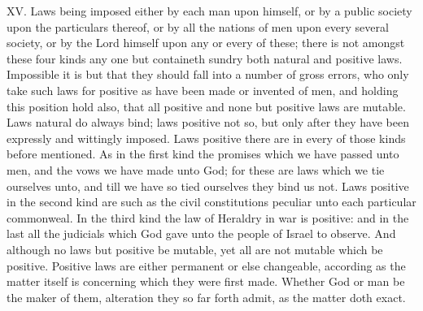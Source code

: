 XV. Laws being imposed either by each man upon himself, or by a public society upon the particulars thereof, or by all the nations of men upon every several society, or by the Lord himself upon any or every of these; there is not amongst these four kinds any one but containeth sundry both natural and positive laws. Impossible it is but that they should fall into a number of gross errors, who only take such laws for positive as have been made or invented of men, and holding this position hold also, that all positive and none but positive laws are mutable. Laws natural do always bind; laws positive not so, but only after they have been expressly and  wittingly imposed. Laws positive there are in every of those kinds before mentioned. As in the first kind the promises which we have passed unto men, and the vows we have made unto God; for these are laws which we tie ourselves unto, and till we have so tied ourselves they bind us not. Laws positive in the second kind are such as the civil constitutions peculiar unto each particular commonweal. In the third kind the law of Heraldry in war is positive: and in the last all the judicials which God gave unto the people of Israel to observe. And although no laws but positive be mutable, yet all are not mutable which be positive. Positive laws are either permanent or else changeable, according as the matter itself is concerning which they were first made. Whether God or man be the maker of them, alteration they so far forth admit, as the matter doth exact.

